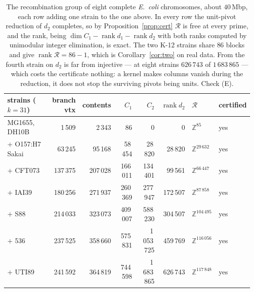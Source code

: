 \documentclass[11pt]{article}
\theoremstyle{plain}
\theoremstyle{definition}
\theoremstyle{remark}
\newcommand{\Z}{\mathbb{Z}}
\newcommand{\rank}{\operatorname{rank}}
\newcommand{\Rec}{\mathcal{R}}
\begin{document}
\begin{table}[t]
\centering
\small
\begin{tabular}{lrrrrrll}
\toprule
strains ($k=31$) & branch vtx & contents & $C_1$ & $C_2$ & $\rank d_2$ & $\Rec$ & certified\\
\midrule
MG1655, DH10B & 1\,509 & 2\,343 & 86 & 0 & 0 & $\Z^{85}$ & yes\\
$+$ O157:H7 Sakai & 63\,245 & 95\,168 & 58\,454 & 28\,820 & 28\,820 & $\Z^{29\,632}$ & yes\\
$+$ CFT073 & 137\,375 & 207\,028 & 166\,011 & 134\,401 & 99\,561 & $\Z^{66\,447}$ & yes\\
$+$ IAI39 & 180\,256 & 271\,937 & 260\,369 & 277\,947 & 172\,507 & $\Z^{87\,858}$ & yes\\
$+$ S88 & 214\,033 & 323\,073 & 409\,007 & 588\,230 & 304\,507 & $\Z^{104\,495}$ & yes\\
$+$ 536 & 237\,525 & 358\,660 & 575\,831 & 1\,053\,725 & 459\,769 & $\Z^{116\,056}$ & yes\\
$+$ UTI89 & 241\,592 & 364\,819 & 744\,598 & 1\,683\,865 & 626\,743 & $\Z^{117\,848}$ & yes\\
\bottomrule
\end{tabular}
\caption{The recombination group of eight complete \emph{E.\ coli} chromosomes, about
$40$\,Mbp, each row adding one strain to the one above. In every row the unit-pivot reduction
of $d_2$ completes, so by Proposition~\ref{prop:cert} $\Rec$ is free at every prime, and the
rank, being $\dim C_1-\rank d_1-\rank d_2$ with both ranks computed by unimodular integer
elimination, is exact. The two K-12 strains share $86$ blocks and give $\rank\Rec=86-1$,
which is Corollary~\ref{cor:two} on real data. From the fourth strain on $d_2$ is far from
injective --- at eight strains $626\,743$ of $1\,683\,865$ --- which costs the certificate
nothing: a kernel makes columns vanish during the reduction, it does not stop the surviving
pivots being units. Check (E).}
\label{tab:real}
\end{table}
\end{document}
